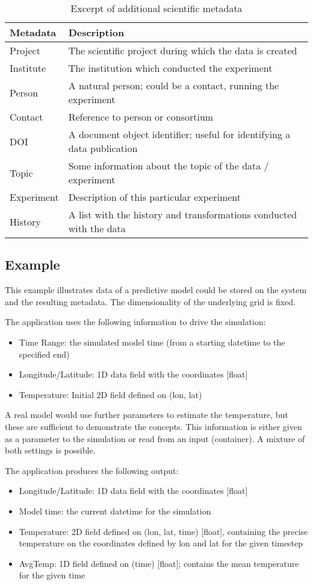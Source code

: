 \begin{table}
\begin{tabular}{ll}
Metadata & Description\\
\hline
Project & The scientific project during which the data is created \\
Institute & The institution which conducted the experiment\\
Person &  A natural person; could be a contact, running the experiment \\
Contact & Reference to person or consortium \\
DOI      & A document object identifier; useful for identifying a data publication\\
Topic     & Some information about the topic of the data / experiment \\
Experiment & Description of this particular experiment \\
History & A list with the history and transformations conducted with the data \\
\end{tabular}
\caption{Excerpt of additional scientific metadata}
\label{tbl:additionalMetadata}
\end{table}



\subsection{Example}

This example illustrates data of a predictive model could be stored on the system and the resulting metadata.
The dimensionality of the underlying grid is fixed.

The application uses the following information to drive the simulation:
\begin{itemize}
	\item Time Range: the simulated model time (from a starting datetime to the specified end)
	\item Longitude/Latitude: 1D data field with the coordinates [float]
	\item Temperature: Initial 2D field defined on (lon, lat)
\end{itemize}
A real model would use further parameters to estimate the temperature, but these are sufficient to demonstrate the concepts.
This information is either given as a parameter to the simulation or read from an input (container).
A mixture of both settings is possible.


The application produces the following output:
\begin{itemize}
	\item Longitude/Latitude: 1D data field with the coordinates [float]
	\item Model time: the current datetime for the simulation
	\item Temperature: 2D field defined on (lon, lat, time) [float], containing the precise temperature on the coordinates defined by lon and lat for the given timestep
	\item AvgTemp: 1D field defined on (time) [float]; contains the mean temperature for the given time
\end{itemize}

